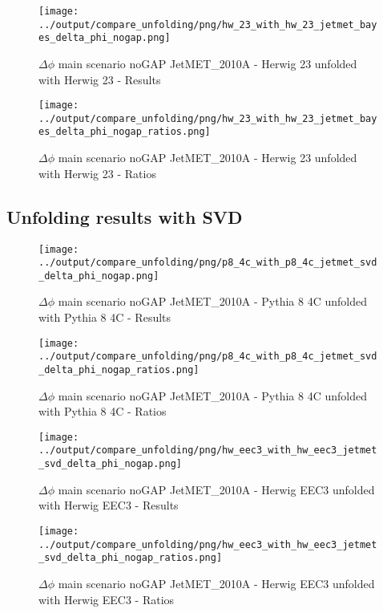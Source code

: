 \documentclass[11pt]{book}
\begin{document}
\begin{figure}[ht]
\centering
\texttt{[image: ../output/compare\_unfolding/png/hw\_23\_with\_hw\_23\_jetmet\_bayes\_delta\_phi\_nogap.png]}
\caption{$\Delta\phi$ main scenario noGAP JetMET\_2010A - Herwig 23 unfolded with Herwig 23 - Results}
\label{hw_23_hw_23_jetmet_bayes_delta_phi_nogap_a}
\end{figure}

\begin{figure}[ht]
\centering
\texttt{[image: ../output/compare\_unfolding/png/hw\_23\_with\_hw\_23\_jetmet\_bayes\_delta\_phi\_nogap\_ratios.png]}
\caption{$\Delta\phi$ main scenario noGAP JetMET\_2010A - Herwig 23 unfolded with Herwig 23 - Ratios}
\label{hw_23_hw_23_jetmet_bayes_delta_phi_nogap_b}
\end{figure}


\clearpage
\subsection{Unfolding results with SVD}

\begin{figure}[ht]
\centering
\texttt{[image: ../output/compare\_unfolding/png/p8\_4c\_with\_p8\_4c\_jetmet\_svd\_delta\_phi\_nogap.png]}
\caption{$\Delta\phi$ main scenario noGAP JetMET\_2010A - Pythia 8 4C unfolded with Pythia 8 4C - Results}
\label{p8_p8_jetmet_svd_delta_phi_nogap_a}
\end{figure}

\begin{figure}[ht]
\centering
\texttt{[image: ../output/compare\_unfolding/png/p8\_4c\_with\_p8\_4c\_jetmet\_svd\_delta\_phi\_nogap\_ratios.png]}
\caption{$\Delta\phi$ main scenario noGAP JetMET\_2010A - Pythia 8 4C unfolded with Pythia 8 4C - Ratios}
\label{p8_p8_jetmet_svd_delta_phi_nogap_b}
\end{figure}

\begin{figure}[ht]
\centering
\texttt{[image: ../output/compare\_unfolding/png/hw\_eec3\_with\_hw\_eec3\_jetmet\_svd\_delta\_phi\_nogap.png]}
\caption{$\Delta\phi$ main scenario noGAP JetMET\_2010A - Herwig EEC3 unfolded with Herwig EEC3 - Results}
\label{hw_eec3_hw_eec3_jetmet_svd_delta_phi_nogap_a}
\end{figure}

\begin{figure}[ht]
\centering
\texttt{[image: ../output/compare\_unfolding/png/hw\_eec3\_with\_hw\_eec3\_jetmet\_svd\_delta\_phi\_nogap\_ratios.png]}
\caption{$\Delta\phi$ main scenario noGAP JetMET\_2010A - Herwig EEC3 unfolded with Herwig EEC3 - Ratios}
\label{hw_eec3_hw_eec3_jetmet_svd_delta_phi_nogap_b}
\end{figure}
\end{document}
